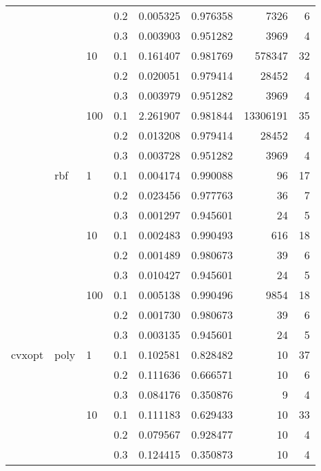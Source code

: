 \begin{table}[H]
\begin{tabular}{llllrrrr}
       &     &     & 0.2 &     0.005325 &  0.976358 &      7326 &     6 \\
       &     &     & 0.3 &     0.003903 &  0.951282 &      3969 &     4 \\
       &     & 10  & 0.1 &     0.161407 &  0.981769 &    578347 &    32 \\
       &     &     & 0.2 &     0.020051 &  0.979414 &     28452 &     4 \\
       &     &     & 0.3 &     0.003979 &  0.951282 &      3969 &     4 \\
       &     & 100 & 0.1 &     2.261907 &  0.981844 &  13306191 &    35 \\
       &     &     & 0.2 &     0.013208 &  0.979414 &     28452 &     4 \\
       &     &     & 0.3 &     0.003728 &  0.951282 &      3969 &     4 \\
       & rbf & 1   & 0.1 &     0.004174 &  0.990088 &        96 &    17 \\
       &     &     & 0.2 &     0.023456 &  0.977763 &        36 &     7 \\
       &     &     & 0.3 &     0.001297 &  0.945601 &        24 &     5 \\
       &     & 10  & 0.1 &     0.002483 &  0.990493 &       616 &    18 \\
       &     &     & 0.2 &     0.001489 &  0.980673 &        39 &     6 \\
       &     &     & 0.3 &     0.010427 &  0.945601 &        24 &     5 \\
       &     & 100 & 0.1 &     0.005138 &  0.990496 &      9854 &    18 \\
       &     &     & 0.2 &     0.001730 &  0.980673 &        39 &     6 \\
       &     &     & 0.3 &     0.003135 &  0.945601 &        24 &     5 \\
cvxopt & poly & 1   & 0.1 &     0.102581 &  0.828482 &        10 &    37 \\
       &     &     & 0.2 &     0.111636 &  0.666571 &        10 &     6 \\
       &     &     & 0.3 &     0.084176 &  0.350876 &         9 &     4 \\
       &     & 10  & 0.1 &     0.111183 &  0.629433 &        10 &    33 \\
       &     &     & 0.2 &     0.079567 &  0.928477 &        10 &     4 \\
       &     &     & 0.3 &     0.124415 &  0.350873 &        10 &     4 \\

\end{tabular}
\end{table}
